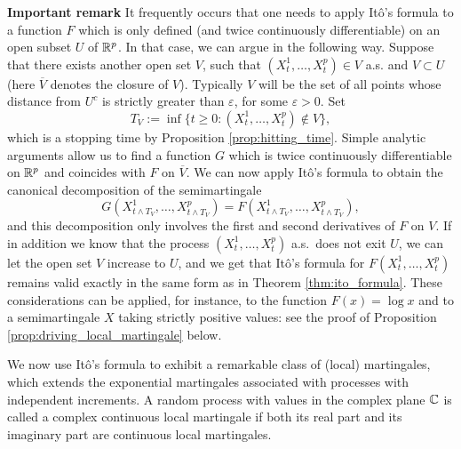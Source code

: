 \documentclass[../Main.tex]{subfiles}
\begin{document}
\textbf{Important remark} It frequently occurs that one needs to apply Itô's formula to a function \(F\) which is only defined (and twice continuously differentiable) on an open subset \(U\) of \(\mathbb{R}^p\). In that case, we can argue in the following way. Suppose that there exists another open set \(V\), such that \((X_t^1,\ldots,X_t^p)\in V\) a.s. and \(V\subset U\) (here \(\overline{V}\) denotes the closure of \(V\)). Typically \(V\) will be the set of all points whose distance from \(U^c\) is strictly greater than \(\varepsilon\), for some \(\varepsilon>0\). Set
\[ T_V:=\inf\{t\geq 0:(X_t^1,\ldots,X_t^p)\notin V\}, \]
which is a stopping time by Proposition \ref{prop:hitting_time}. Simple analytic arguments allow
us to find a function \(G\) which is twice continuously differentiable on
\(\mathbb{R}^p\) and coincides with \(F\) on \(\overline{V}\). We can now apply
Itô's formula to obtain the canonical decomposition of the semimartingale
\[ G(X_{t\wedge T_V}^1,\ldots,X_{t\wedge T_V}^p) = F(X_{t\wedge T_V}^1,\ldots,X_{t\wedge T_V}^p),
\]
and this decomposition only involves the first and second derivatives of \(F\)
on \(V\). If in addition we know that the process
\((X_t^1,\ldots,X_t^p)\) a.s.\ does not exit \(U\), we can let the open set
\(V\) increase to \(U\), and we get that Itô's formula for
\(F(X_t^1,\ldots,X_t^p)\) remains valid exactly in the same form as in
Theorem \ref{thm:ito_formula}. These considerations can be applied, for instance, to the
function \(F(x)=\log x\) and to a semimartingale \(X\) taking strictly positive values: see the proof of Proposition  \ref{prop:driving_local_martingale} below.

We now use Itô's formula to exhibit a remarkable class of (local) martingales, which extends the exponential martingales associated with processes with independent increments. A random process with values in the complex plane \(\mathbb{C}\) is called a complex continuous local martingale if both its real part and its imaginary part are continuous local martingales.
\end{document}
